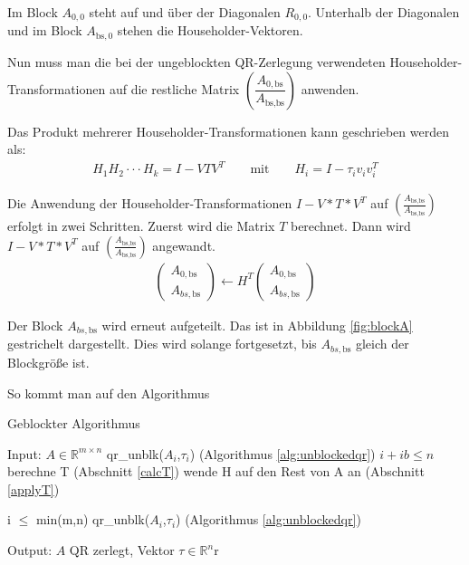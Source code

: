 Im Block $A_{0, 0}$ steht auf und über der Diagonalen $R_{0,0}$. Unterhalb der Diagonalen und im Block $A_{\text{bs}, 0}$ stehen die Householder-Vektoren.

Nun muss man die bei der ungeblockten QR-Zerlegung verwendeten Householder-Transformationen auf die restliche Matrix $ \left(\dfrac{A_{0, \text{bs}}}{A_{\text{bs}, \text{bs}}} \right)$ anwenden.

Das Produkt mehrerer Householder-Transformationen kann geschrieben werden als:
\begin{align*}
H_1H_2 \cdot \cdot \cdot H_k = I - VTV^T \qquad \text{mit}\qquad H_i = I - \tau_i v_iv_i^T
\end{align*}  \cite{Joffrain:2006:AHT:1141885.1141886}

Die Anwendung der Householder-Transformationen $I - V*T*V^T$ auf $\left(\frac{A_{\text{bs}, \text{bs}}}{A_{\text{bs}, \text{bs}}} \right)$ erfolgt in zwei Schritten. Zuerst wird  die Matrix $T$ berechnet. Dann wird $I - V*T*V^T$  auf $\left(\frac{A_{\text{bs}, \text{bs}}}{A_{\text{bs}, \text{bs}}} \right)$ angewandt.
\begin{align}
	\left(\begin{array}{l} 
	A_{0, \text{bs}} \\ \hline
	A_{bs, \text{bs}}
	\end{array}\right)
	\leftarrow
	H^T \left(\begin{array}{l} 
	A_{0, \text{bs}} \\ \hline
	A_{bs, \text{bs}}
	\end{array}\right)
\end{align}

Der Block $A_{bs, \text{bs}}$ wird erneut aufgeteilt. Das ist in Abbildung \ref{fig:blockA} gestrichelt dargestellt.
Dies wird solange fortgesetzt, bis $A_{bs, \text{bs}}$ gleich der Blockgröße ist.

So kommt man auf den Algorithmus 

\begin{algorithm}[H]
	\caption{Geblockter Algorithmus}
	\label{alg:blockedqr}
	\begin{algorithmic}[1]
		\State Input: $A \in \mathbb{R}^{m \times n}$
			\State qr\_unblk($A_i$,$\tau_i$) (Algorithmus \ref{alg:unblockedqr})
			\If $i + ib \le n$
				\State berechne T (Abschnitt \ref{calcT})
				\State wende H auf den Rest von A an (Abschnitt \ref{applyT})
			\EndIf 
		\EndFor	
		
		\If i $\le$ min(m,n)
			\State qr\_unblk($A_i$,$\tau_i$) (Algorithmus \ref{alg:unblockedqr})
		\EndIf
		 
		\State Output: $A$ QR zerlegt, Vektor $\tau \in \mathbb{R}^n$r
	\end{algorithmic}
\end{algorithm}


